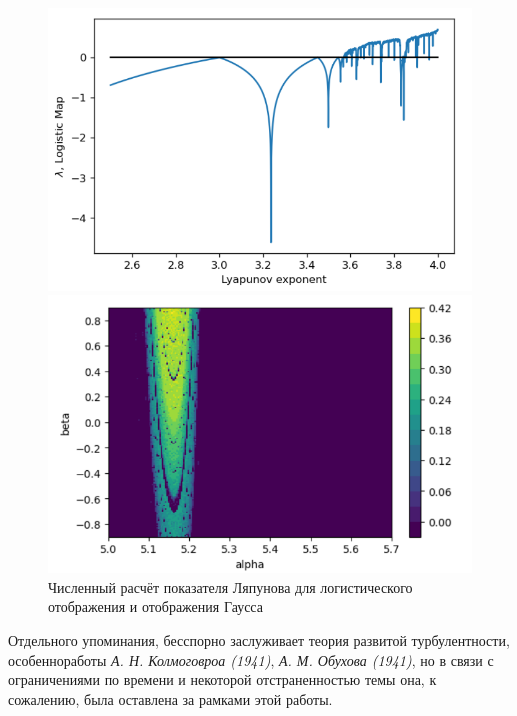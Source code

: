 \begin{figure}[h]
\begin{minipage}[t]{0.49\linewidth}
        \centering
        \includegraphics[width=\linewidth]{img/lyap_exp.png}
\end{minipage}
\hfill
\begin{minipage}[t]{0.49 \linewidth}
        \centering
        \includegraphics[width=\linewidth]{img/Gauss_map.png}
\end{minipage}
        \caption{Численный расчёт показателя Ляпунова для логистического отображения и отображения Гаусса}
        \label{fig:exp}
\end{figure}

Отдельного упоминания, бесспорно заслуживает теория развитой турбулентности, особенноработы \textit{А. Н. Колмоговроа (1941)}, \textit{А. М. Обухова (1941)}, но в связи с ограничениями по времени и некоторой отстраненностью темы она, к сожалению, была оставлена за рамками этой работы.   